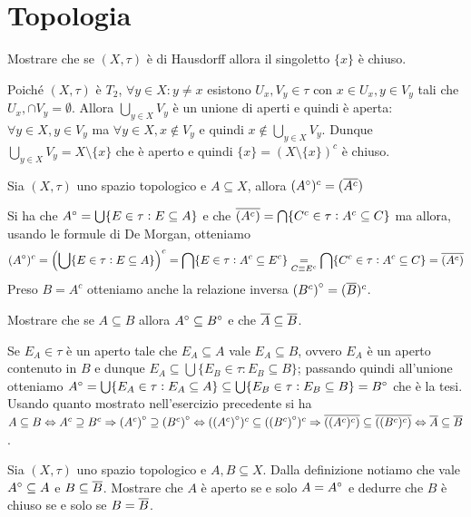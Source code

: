 \documentclass[a4paper]{article}\par \usepackage{style}\par
\begin{document}
\section{Topologia}
\begin{es}
  Mostrare che se $ (X, \tau) $ è di Hausdorff allora il singoletto $ \{x\} $ è chiuso.
\end{es}\par Poiché $ (X, \tau) $ è $ T_2 $, $ \forall y \in X : y \neq x $ esistono $ U_x, V_y \in \tau $ con $ x \in U_x, y \in V_y $ tali che $ U_x, \cap V_y = \emptyset $. Allora $ \bigcup_{y \in X} V_y $ è un unione di aperti e quindi è aperta: $ \forall y \in X, y \in V_y $ ma $ \forall y \in X, x \notin V_y $ e quindi $ x \notin \bigcup_{y \in X} V_y $. Dunque $ \bigcup_{y \in X} V_y = X \setminus \{x\} $ che è aperto e quindi $ \{x\} = (X \setminus \{x\})^c $ è chiuso.\par \begin{es}
  Sia $ (X, \tau) $ uno spazio topologico e $ A \subseteq X $, allora $ ({A}^{\circ})^c = (\overline{A^c}) $
\end{es}\par Si ha che $ {A}^{\circ} = \bigcup \{E \in \tau : E \subseteq A\} $ e che $ \overline{(A^c)} = \bigcap \{C^c \in \tau : A^c \subseteq C\} $ ma allora, usando le formule di De Morgan, otteniamo
\[({A}^{\circ})^c = \left(\bigcup \{E \in \tau : E \subseteq A\}\right)^c = \bigcap \{E \in \tau : A^c \subseteq E^c\} \underset{C \equiv E^c}{=} \bigcap \{C^c \in \tau : A^c \subseteq C\} = \overline{(A^c)}\]
Preso $ B = A^c $ otteniamo anche la relazione inversa $ {(B^c)}^{\circ} = (\overline{B})^c $.\par \begin{es}
  Mostrare che se $ A \subseteq B $ allora $ {A}^{\circ} \subseteq {B}^{\circ} $ e che $ \overline{A} \subseteq \overline{B} $.
\end{es}\par Se $ E_A \in \tau $ è un aperto tale che $ E_A \subseteq A $ vale $ E_A \subseteq B $, ovvero $ E_A $ è un aperto contenuto in $ B $ e dunque $ E_A \subseteq \bigcup \{E_B \in \tau : E_B \subseteq B\} $; passando quindi all'unione otteniamo  $ {A}^{\circ} = \bigcup \{E_A \in \tau : E_A \subseteq A\} \subseteq  \bigcup \{E_B \in \tau : E_B \subseteq B\} = {B}^{\circ} $ che è la tesi. \\
Usando quanto mostrato nell'esercizio precedente si ha $ A \subseteq B \Leftrightarrow A^c \supseteq B^c \Rightarrow {(A^c)}^{\circ} \supseteq {(B^c)}^{\circ} \Leftrightarrow ({(A^c)}^{\circ})^c \subseteq ({(B^c)}^{\circ})^c \Rightarrow \overline{((A^c)^c)} \subseteq \overline{((B^c)^c)} \Leftrightarrow \overline{A} \subseteq \overline{B} $.\par \begin{es}
  Sia $ (X, \tau) $ uno spazio topologico e $ A, B \subseteq X $. Dalla definizione notiamo che vale $ {A}^{\circ} \subseteq A $ e $ B \subseteq \overline{B} $. Mostrare che $ A $ è aperto se e solo $ A = {A}^{\circ} $ e dedurre che $ B $ è chiuso se e solo se $ B = \overline{B} $.
\end{es}
\end{document}
